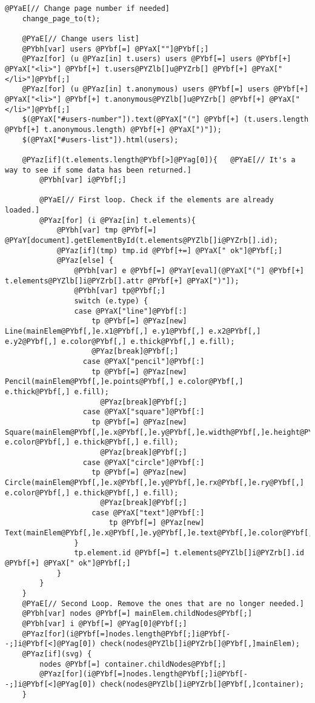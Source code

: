 \begin{Verbatim}[commandchars=@\[\]]
	@PYaE[// Change page number if needed]
	change_page_to(t);

	@PYaE[// Change users list]
	@PYbh[var] users @PYbf[=] @PYaX[""]@PYbf[;]
	@PYaz[for] (u @PYaz[in] t.users) users @PYbf[=] users @PYbf[+] @PYaX["<li>"] @PYbf[+] t.users@PYZlb[]u@PYZrb[] @PYbf[+] @PYaX["</li>"]@PYbf[;]
	@PYaz[for] (u @PYaz[in] t.anonymous) users @PYbf[=] users @PYbf[+] @PYaX["<li>"] @PYbf[+] t.anonymous@PYZlb[]u@PYZrb[] @PYbf[+] @PYaX["</li>"]@PYbf[;]
	$(@PYaX["#users-number"]).text(@PYaX["("] @PYbf[+] (t.users.length @PYbf[+] t.anonymous.length) @PYbf[+] @PYaX[")"]);
	$(@PYaX["#users-list"]).html(users);
	
	@PYaz[if](t.elements.length@PYbf[>]@PYag[0]){	@PYaE[// It's a way to see if some data has been returned.]
		@PYbh[var] i@PYbf[;]
		
		@PYaE[// First loop. Check if the elements are already loaded.]
		@PYaz[for] (i @PYaz[in] t.elements){
			@PYbh[var] tmp @PYbf[=] @PYaY[document].getElementById(t.elements@PYZlb[]i@PYZrb[].id);
			@PYaz[if](tmp) tmp.id @PYbf[+=] @PYaX[" ok"]@PYbf[;]
			@PYaz[else] {
				@PYbh[var] e @PYbf[=] @PYaY[eval](@PYaX["("] @PYbf[+] t.elements@PYZlb[]i@PYZrb[].attr @PYbf[+] @PYaX[")"]);
				@PYbh[var] tp@PYbf[;]
				switch (e.type) {
			    case @PYaX["line"]@PYbf[:]
					tp @PYbf[=] @PYaz[new] Line(mainElem@PYbf[,]e.x1@PYbf[,] e.y1@PYbf[,] e.x2@PYbf[,] e.y2@PYbf[,] e.color@PYbf[,] e.thick@PYbf[,] e.fill);
					@PYaz[break]@PYbf[;]
			      case @PYaX["pencil"]@PYbf[:]
					tp @PYbf[=] @PYaz[new] Pencil(mainElem@PYbf[,]e.points@PYbf[,] e.color@PYbf[,] e.thick@PYbf[,] e.fill);
			          @PYaz[break]@PYbf[;]
			      case @PYaX["square"]@PYbf[:]
					tp @PYbf[=] @PYaz[new] Square(mainElem@PYbf[,]e.x@PYbf[,]e.y@PYbf[,]e.width@PYbf[,]e.height@PYbf[,] e.color@PYbf[,] e.thick@PYbf[,] e.fill);
			          @PYaz[break]@PYbf[;]
			      case @PYaX["circle"]@PYbf[:]
					tp @PYbf[=] @PYaz[new] Circle(mainElem@PYbf[,]e.x@PYbf[,]e.y@PYbf[,]e.rx@PYbf[,]e.ry@PYbf[,] e.color@PYbf[,] e.thick@PYbf[,] e.fill);
			          @PYaz[break]@PYbf[;]
					case @PYaX["text"]@PYbf[:]
						tp @PYbf[=] @PYaz[new] Text(mainElem@PYbf[,]e.x@PYbf[,]e.y@PYbf[,]e.text@PYbf[,]e.color@PYbf[,]e.size@PYbf[,]e.font@PYbf[,]e.fill);
			    }
				tp.element.id @PYbf[=] t.elements@PYZlb[]i@PYZrb[].id @PYbf[+] @PYaX[" ok"]@PYbf[;]
			}
		}
	}
	@PYaE[// Second Loop. Remove the ones that are no longer needed.]
	@PYbh[var] nodes @PYbf[=] mainElem.childNodes@PYbf[;]
	@PYbh[var] i @PYbf[=] @PYag[0]@PYbf[;]
	@PYaz[for](i@PYbf[=]nodes.length@PYbf[;]i@PYbf[--;]i@PYbf[<]@PYag[0]) check(nodes@PYZlb[]i@PYZrb[]@PYbf[,]mainElem);
	@PYaz[if](svg) {
		nodes @PYbf[=] container.childNodes@PYbf[;]
		@PYaz[for](i@PYbf[=]nodes.length@PYbf[;]i@PYbf[--;]i@PYbf[<]@PYag[0]) check(nodes@PYZlb[]i@PYZrb[]@PYbf[,]container);
	}
	

\end{Verbatim}

